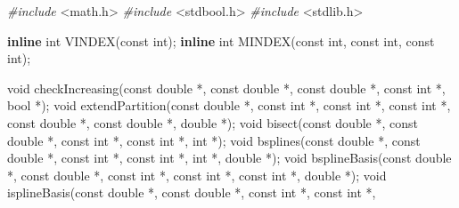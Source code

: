 \documentclass[
  12pt,
]{article}
\newenvironment{Shaded}{\begin{snugshade}}{\end{snugshade}}
\newcommand{\DataTypeTok}[1]{\textcolor[rgb]{0.13,0.29,0.53}{#1}}
\newcommand{\ImportTok}[1]{#1}
\newcommand{\KeywordTok}[1]{\textcolor[rgb]{0.13,0.29,0.53}{\textbf{#1}}}
\newcommand{\NormalTok}[1]{#1}
\newcommand{\PreprocessorTok}[1]{\textcolor[rgb]{0.56,0.35,0.01}{\textit{#1}}}
\begin{document}
\begin{Shaded}
\begin{Highlighting}[]

\PreprocessorTok{\#include }\ImportTok{\textless{}math.h\textgreater{}}
\PreprocessorTok{\#include }\ImportTok{\textless{}stdbool.h\textgreater{}}
\PreprocessorTok{\#include }\ImportTok{\textless{}stdlib.h\textgreater{}}

\KeywordTok{inline} \DataTypeTok{int}\NormalTok{ VINDEX(}\DataTypeTok{const} \DataTypeTok{int}\NormalTok{);}
\KeywordTok{inline} \DataTypeTok{int}\NormalTok{ MINDEX(}\DataTypeTok{const} \DataTypeTok{int}\NormalTok{, }\DataTypeTok{const} \DataTypeTok{int}\NormalTok{, }\DataTypeTok{const} \DataTypeTok{int}\NormalTok{);}

\DataTypeTok{void}\NormalTok{ checkIncreasing(}\DataTypeTok{const} \DataTypeTok{double}\NormalTok{ *, }\DataTypeTok{const} \DataTypeTok{double}\NormalTok{ *, }\DataTypeTok{const} \DataTypeTok{double}\NormalTok{ *,}
                     \DataTypeTok{const} \DataTypeTok{int}\NormalTok{ *, }\DataTypeTok{bool}\NormalTok{ *);}
\DataTypeTok{void}\NormalTok{ extendPartition(}\DataTypeTok{const} \DataTypeTok{double}\NormalTok{ *, }\DataTypeTok{const} \DataTypeTok{int}\NormalTok{ *, }\DataTypeTok{const} \DataTypeTok{int}\NormalTok{ *, }\DataTypeTok{const} \DataTypeTok{int}\NormalTok{ *,}
                     \DataTypeTok{const} \DataTypeTok{double}\NormalTok{ *, }\DataTypeTok{const} \DataTypeTok{double}\NormalTok{ *, }\DataTypeTok{double}\NormalTok{ *);}
\DataTypeTok{void}\NormalTok{ bisect(}\DataTypeTok{const} \DataTypeTok{double}\NormalTok{ *, }\DataTypeTok{const} \DataTypeTok{double}\NormalTok{ *, }\DataTypeTok{const} \DataTypeTok{int}\NormalTok{ *, }\DataTypeTok{const} \DataTypeTok{int}\NormalTok{ *, }\DataTypeTok{int}\NormalTok{ *);}
\DataTypeTok{void}\NormalTok{ bsplines(}\DataTypeTok{const} \DataTypeTok{double}\NormalTok{ *, }\DataTypeTok{const} \DataTypeTok{double}\NormalTok{ *, }\DataTypeTok{const} \DataTypeTok{int}\NormalTok{ *, }\DataTypeTok{const} \DataTypeTok{int}\NormalTok{ *, }\DataTypeTok{int}\NormalTok{ *,}
              \DataTypeTok{double}\NormalTok{ *);}
\DataTypeTok{void}\NormalTok{ bsplineBasis(}\DataTypeTok{const} \DataTypeTok{double}\NormalTok{ *, }\DataTypeTok{const} \DataTypeTok{double}\NormalTok{ *, }\DataTypeTok{const} \DataTypeTok{int}\NormalTok{ *, }\DataTypeTok{const} \DataTypeTok{int}\NormalTok{ *,}
                  \DataTypeTok{const} \DataTypeTok{int}\NormalTok{ *, }\DataTypeTok{double}\NormalTok{ *);}
\DataTypeTok{void}\NormalTok{ isplineBasis(}\DataTypeTok{const} \DataTypeTok{double}\NormalTok{ *, }\DataTypeTok{const} \DataTypeTok{double}\NormalTok{ *, }\DataTypeTok{const} \DataTypeTok{int}\NormalTok{ *, }\DataTypeTok{const} \DataTypeTok{int}\NormalTok{ *,}

\end{Highlighting}
\end{Shaded}
\end{document}
